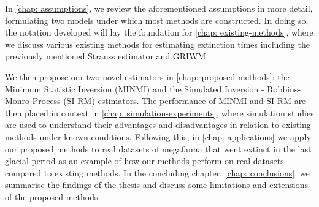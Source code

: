 In \autoref{chap: assumptions}, we review the aforementioned assumptions in more detail, formulating two models under which most methods are constructed. In doing so, the notation developed will lay the foundation for \autoref{chap: existing-methods}, where we discuss various existing methods for estimating extinction times including the previously mentioned Strauss estimator and GRIWM.

We then propose our two novel estimators in \autoref{chap: proposed-methods}: the Minimum Statistic Inversion (MINMI) and the Simulated Inversion - Robbins-Monro Process (SI-RM) estimators. The performance of MINMI and SI-RM are then placed in context in \autoref{chap: simulation-experiments}, where simulation studies are used to understand their advantages and disadvantages in relation to existing methods under known conditions. Following this, in \autoref{chap: applications} we apply our proposed methods to real datasets of megafauna that went extinct in the last glacial period \cite{Baca2016} as an example of how our methods perform on real datasets compared to existing methods. In the concluding chapter, \autoref{chap: conclusions}, we summarise the findings of the thesis and discuss some limitations and extensions of the proposed methods.
